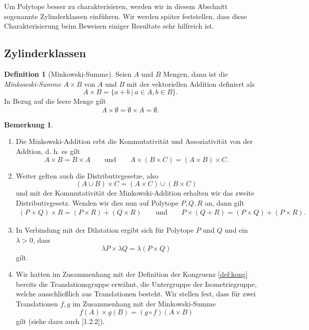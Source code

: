 \documentclass[11pt,titlepage]{article}
\theoremstyle{definition}
\newtheorem{definition}[theorem]{Definition}
\newtheorem{remark}[theorem]{Bemerkung}
\theoremstyle{remark}
\begin{document}
	Um Polytope besser zu charakterisieren, werden wir in diesem Abschnitt 
	sogenannte Zylinderklassen einführen. Wir werden später feststellen, 
	dass diese Charakterisierung beim Beweisen einiger Resultate sehr 
	hilfreich ist.

	\subsection{Zylinderklassen}
	
	\begin{definition}[Minkowski-Summe]
		Seien $A$ und $B$ Mengen, dann ist die \textsl{Minkowski-Summe} $A\times B$ 
		von $A$ und $B$ mit der vektoriellen Addition definiert als
		\[A\times B=\left.\{a+b\ \right\vert\ a\in A,b\in B\}.\]
		In Bezug auf die leere Menge gilt
		\[A\times \emptyset =\emptyset\times A=\emptyset.\]
	\end{definition}
	
	\begin{remark} \label{bem:mink}
		\begin{enumerate}
			Seien $A,B,C$ Mengen, dann ergeben sich folgende Eigenschaften 
			mit der Minkowski-Summe.
			\item Die Minkowski-Addition erbt die Kommutativität und Assoziativität von der Addtion, d. h. 
			es gilt
			\[A\times B=B\times A\qquad\text{und}\qquad A\times(B\times C)=(A\times B)\times C.\]
			
			\item \label{bem:mink;3} 
			Weiter gelten auch die Distributivgesetze, also 
			\[(A\cup B)\times C=(A\times C)\cup (B\times C)\]
			und mit der Kommutativität der Minkowski-Addition erhalten wir das zweite 
			Distributivgesetz. Wenden wir dies nun auf Polytope 
			$P,Q,R$ an, dann gilt
			\begin{align}
			(P+Q)\times R =(P\times R)+(Q\times R)\qquad\text{und}\qquad
			P\times (Q+R)=(P\times Q)+(P\times R).
			\end{align}
			\item \label{bem:mink;1}In Verbindung mit der Dilatation ergibt sich für Polytope 
			$P$ und $Q$ und ein $\lambda>0$, dass
			\[\lambda P\times \lambda Q=\lambda(P\times Q)\]
			gilt.
			\item \label{bem:mink;2} 
			Wir hatten im Zusammenhang mit der Definition der 
			Kongruenz \ref{def:kong} bereits die Translationsgruppe 
			erwähnt, die Untergruppe der Isometriegruppe, welche ausschließlich 
			aus Translationen besteht. Wir stellen fest, dass für zwei 
			Translationen $f,g$ im Zusammenhang mit der Minkowski-Summe 
			\[f(A)\times g(B)=(g\circ f)(A\times B)\]
			gilt (siehe dazu auch \cite{Hadwiger}[1.2.2]).
		\end{enumerate}
	\end{remark}
	
\end{document}
